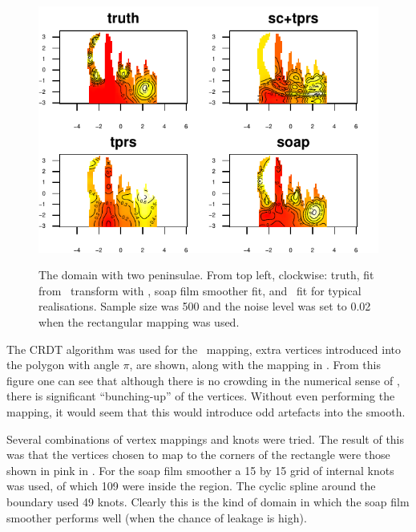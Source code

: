 \begin{figure}
\centering
\includegraphics[width=6in]{sc/figs/wigglytop2-real.pdf} \\
\caption{The domain with two peninsulae. From top left, clockwise: truth, fit from \sch\ transform with \tprs, soap film smoother fit, and \tprs\ fit for typical realisations. Sample size was 500 and the noise level was set to 0.02 when the rectangular mapping was used.}
\label{sc-wigglytop2-real}
\end{figure}

The CRDT algorithm was used for the \sch\ mapping, extra vertices introduced into the polygon with angle $\pi$, are shown, along with the mapping in . From this figure one can see that although there is no crowding in the numerical sense of \cite{driscoll}, there is significant ``bunching-up'' of the vertices. Without even performing the mapping, it would seem that this would introduce odd artefacts into the smooth.

Several combinations of vertex mappings and knots were tried. The result of this was that the vertices chosen to map to the corners of the rectangle were those shown in pink in . For the soap film smoother a 15 by 15 grid of internal knots was used, of which 109 were inside the region. The cyclic spline around the boundary used 49 knots. Clearly this is the kind of domain in which the soap film smoother performs well (when the chance of leakage is high).


